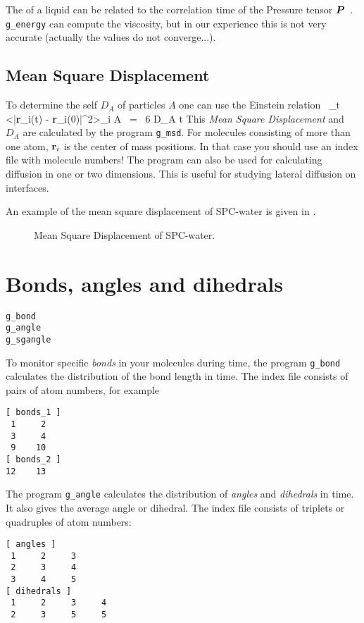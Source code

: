 The  of a liquid can be related to the correlation 
time of the Pressure tensor $\mbox{\boldmath ${P}$}$~\cite{PSmith93c,Balasubramanian96}.
{\tt g\_energy} can compute the viscosity, but in our experience this is not very
accurate (actually the values do not converge...).

\subsection{Mean Square Displacement}
\label{sec:msd}
To determine the self  $D_A$ of particles $A$ one
can use the Einstein relation~\cite{Allen87} \beq \lim_{t \rightarrow
\infty} <|{\bf r}_i(t) - {\bf r}_i(0)|^2>_{i \in A} ~=~ 6 D_A t \eeq
This {\em Mean Square Displacement} and $D_A$ are calculated by the
program {\tt g\_msd}. For molecules consisting of more than one atom,
${\bf r}_i$ is the center of mass positions. In that case you should
use an index file with molecule numbers! The program can also be used
for calculating diffusion in one or two dimensions. This is useful for
studying lateral diffusion on interfaces. 

An example of the mean square displacement of SPC-water is given in
.

\begin{figure}
\centerline{
{}}
\caption{Mean Square Displacement of SPC-water.}
\label{fig:msdwater}
\end{figure}

% 
% 
\section{Bonds, angles and dihedrals}
\label{sec:bad}
\begin{verbatim}
g_bond
g_angle
g_sgangle
\end{verbatim}
To monitor specific {\em bonds} in your molecules during time, the program 
{\tt g\_bond} calculates the distribution of the bond length in time. 
The index file consists of pairs of atom numbers, for example
{\samepage
\begin{verbatim}
[ bonds_1 ]
 1     2
 3     4
 9    10
[ bonds_2 ]
12    13
\end{verbatim}}

The program {\tt g\_angle} calculates the distribution of {\em angles} and 
{\em dihedrals} in time. It also gives the average angle or dihedral. 
The index file consists of triplets or quadruples of atom numbers:
{\samepage
\begin{verbatim}
[ angles ]
 1     2     3
 2     3     4
 3     4     5
[ dihedrals ]
 1     2     3     4
 2     3     5     5
\end{verbatim}}

